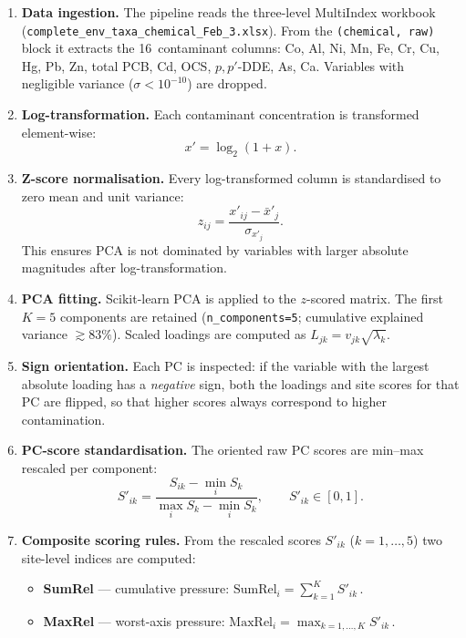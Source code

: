 \documentclass[11pt]{article}
\begin{document}
\begin{enumerate}[leftmargin=*]
  \item \textbf{Data ingestion.}
    The pipeline reads the three-level MultiIndex workbook
    (\texttt{complete\_env\_taxa\_chemical\_Feb\_3.xlsx}).
    From the \texttt{(chemical, raw)} block it extracts the
    16~contaminant columns:
    Co, Al, Ni, Mn, Fe, Cr, Cu, Hg, Pb, Zn, total PCB, Cd, OCS,
    $p{,}p'$-DDE, As, Ca.
    Variables with negligible variance ($\sigma < 10^{-10}$) are
    dropped.

  \item \textbf{Log-transformation.}
    Each contaminant concentration is transformed element-wise:
    \[
      x' = \log_2(1 + x).
    \]

  \item \textbf{Z-score normalisation.}
    Every log-transformed column is standardised to zero mean and unit
    variance:
    \[
      z_{ij} = \frac{x'_{ij} - \bar{x}'_{j}}{\sigma_{x'_j}}.
    \]
    This ensures PCA is not dominated by variables with larger
    absolute magnitudes after log-transformation.

  \item \textbf{PCA fitting.}
    Scikit-learn PCA is applied to the $z$-scored matrix.
    The first $K = 5$ components are retained
    (\texttt{n\_components=5}; cumulative explained variance
    $\gtrsim 83\%$).
    Scaled loadings are computed as
    $L_{jk} = v_{jk}\sqrt{\lambda_k}$.

  \item \textbf{Sign orientation.}
    Each PC is inspected: if the variable with the largest absolute
    loading has a \emph{negative} sign, both the loadings and site
    scores for that PC are flipped, so that higher scores always
    correspond to higher contamination.

  \item \textbf{PC-score standardisation.}
    The oriented raw PC scores are min--max rescaled per component:
    \[
      S'_{ik} = \frac{S_{ik} - \min_i S_k}
                     {\max_i S_k - \min_i S_k},
      \qquad S'_{ik} \in [0,1].
    \]

  \item \textbf{Composite scoring rules.}
    From the rescaled scores $S'_{ik}$ ($k = 1,\dots,5$) two
    site-level indices are computed:
    \begin{itemize}
      \item \textbf{SumRel} — cumulative pressure:
        $\displaystyle
          \mathrm{SumRel}_i = \sum_{k=1}^{K} S'_{ik}$\,.
      \item \textbf{MaxRel} — worst-axis pressure:
        $\displaystyle
          \mathrm{MaxRel}_i = \max_{k=1,\dots,K} S'_{ik}$\,.
    \end{itemize}
\end{enumerate}
\end{document}
